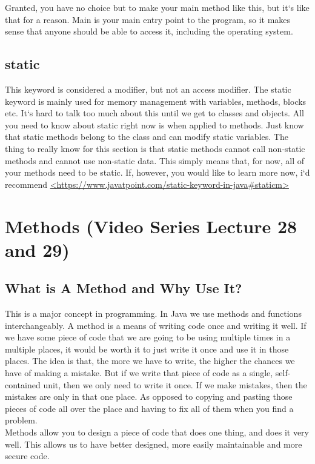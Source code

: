 \documentclass[11]{article}
\begin{document}
Granted, you have no choice but to make your main method like this, but it`s like that for a reason. Main is your main entry point to the program, so it makes sense that anyone should be able to access it, including the operating system.
\subsection{static}
This keyword is considered a modifier, but not an access modifier. The static keyword is mainly used for memory management with variables, methods, blocks etc. It`s hard to talk too much about this until we get to classes and objects. All you need to know about static right now is when applied to methods. Just know that static methods belong to the class and can modify static variables. The thing to really know for this section is  that static methods cannot call non-static methods and cannot use non-static data. This simply means that, for now, all of your methods need to be static. If, however, you would like to learn more now, i`d recommend \url{<https://www.javatpoint.com/static-keyword-in-java#staticm>}

\section{Methods (Video Series Lecture 28 and 29)}
\subsection{What is A Method and Why Use It?}
This is a major concept in programming. In Java we use methods and functions interchangeably. A method is a means of writing code once and writing it well. If we have some piece of code that we are going to be using multiple times in a multiple places, it would be worth it to just write it once and use it in those places. The idea is that, the more we have to write, the higher the chances we have of making a mistake. But if we write that piece of code as a single, self-contained unit, then we only need to write it once. If we make mistakes, then the mistakes are only in that one place. As opposed to copying and pasting those pieces of code all over the place and having to fix all of them when you find a problem.\\

Methods allow you to design a piece of code that does one thing, and does it very well. This allows us to have better designed, more easily maintainable and more secure code.\\
\end{document}
